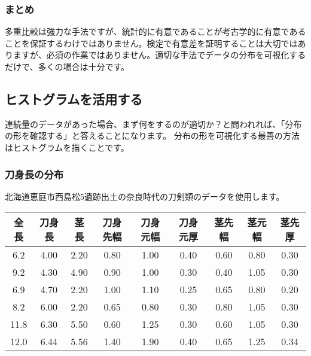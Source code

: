 \documentclass[]{article}
\newenvironment{Shaded}{\begin{snugshade}}{\end{snugshade}}
\newcommand{\DecValTok}[1]{\textcolor[rgb]{0.00,0.00,0.81}{#1}}
\newcommand{\KeywordTok}[1]{\textcolor[rgb]{0.13,0.29,0.53}{\textbf{#1}}}
\newcommand{\NormalTok}[1]{#1}
\newcommand{\OperatorTok}[1]{\textcolor[rgb]{0.81,0.36,0.00}{\textbf{#1}}}
\newcommand{\StringTok}[1]{\textcolor[rgb]{0.31,0.60,0.02}{#1}}
\begin{document}
\hypertarget{-1}{%
\subsubsection{まとめ}\label{-1}}

多重比較は強力な手法ですが、統計的に有意であることが考古学的に有意であることを保証するわけではありません。検定で有意差を証明することは大切ではありますが、必須の作業ではありません。適切な手法でデータの分布を可視化するだけで、多くの場合は十分です。

\subsection{ヒストグラムを活用する}

連続量のデータがあった場合、まず何をするのが適切か？と問われれば、「分布の形を確認する」と答えることになります。
分布の形を可視化する最善の方法はヒストグラムを描くことです。

\subsubsection{刀身長の分布}

北海道恵庭市西島松5遺跡出土の奈良時代の刀剣類のデータを使用します。

\begin{Shaded}
\end{Shaded}

\begin{longtable}[]{@{}ccccccccc@{}}
\toprule
全長 & 刀身長 & 茎長 & 刀身先幅 & 刀身元幅 & 刀身元厚 & 茎先幅 & 茎元幅
& 茎先厚\tabularnewline
\midrule
\endhead
6.2 & 4.00 & 2.20 & 0.80 & 1.00 & 0.40 & 0.60 & 0.80 &
0.30\tabularnewline
9.2 & 4.30 & 4.90 & 0.90 & 1.00 & 0.30 & 0.40 & 1.05 &
0.30\tabularnewline
6.9 & 4.70 & 2.20 & 1.00 & 1.10 & 0.25 & 0.65 & 0.80 &
0.20\tabularnewline
8.2 & 6.00 & 2.20 & 0.65 & 0.80 & 0.30 & 0.80 & 1.05 &
0.30\tabularnewline
11.8 & 6.30 & 5.50 & 0.60 & 1.25 & 0.30 & 0.60 & 1.05 &
0.30\tabularnewline
12.0 & 6.44 & 5.56 & 1.40 & 1.90 & 0.40 & 0.65 & 1.25 &
0.34\tabularnewline
\bottomrule
\end{longtable}
\end{document}
